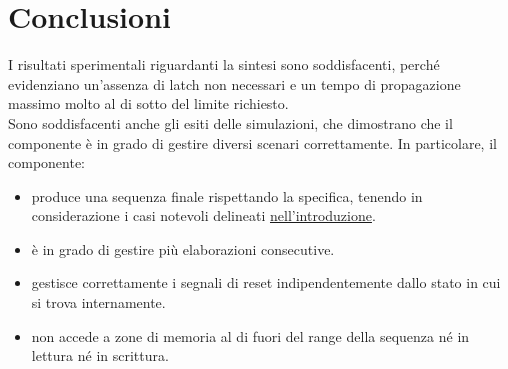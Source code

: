 \documentclass{article}
\begin{document}
\section{Conclusioni}

I risultati sperimentali riguardanti la sintesi sono soddisfacenti, perché evidenziano un'assenza di latch non necessari e un tempo di propagazione massimo molto al di sotto del limite richiesto. \\

Sono soddisfacenti anche gli esiti delle simulazioni, che dimostrano che il componente è in grado di gestire diversi scenari correttamente. In particolare, il componente:

\begin{itemize}
    \item produce una sequenza finale rispettando la specifica, tenendo in considerazione i casi notevoli delineati \hyperref[par:casi-notevoli]{nell'introduzione}.
    \item è in grado di gestire più elaborazioni consecutive.
    \item gestisce correttamente i segnali di reset indipendentemente dallo stato in cui si trova internamente.
    \item non accede a zone di memoria al di fuori del range della sequenza né in lettura né in scrittura.
\end{itemize}
\end{document}
